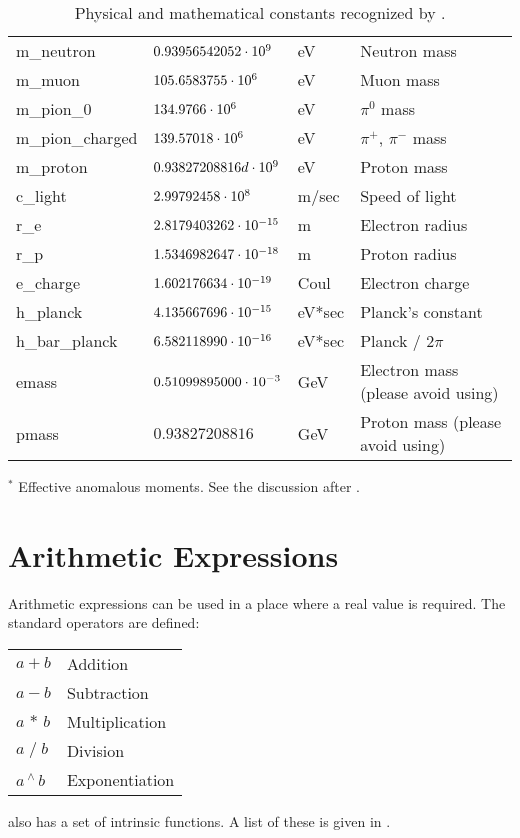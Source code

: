 {{{{{\begin{table}[h]
\begin{tabular}{llll}
  m_neutron             & $0.93956542052 \cdot 10^{9}$    & eV          & Neutron mass          \\
  m_muon                & $105.6583755 \cdot 10^{6}$      & eV          & Muon mass             \\
  m_pion_0              & $134.9766 \cdot 10^{6}$         & eV          & $\pi^0$ mass          \\
  m_pion_charged        & $139.57018 \cdot 10^{6}$        & eV          & $\pi^+$, $\pi^-$ mass \\
  m_proton              & $0.93827208816d \cdot 10^{9}$   & eV          & Proton mass           \\
  c_light               & $2.99792458 \cdot 10^{8}$       & m/sec       & Speed of light        \\
  r_e                   & $2.8179403262 \cdot 10^{-15}$   & m           & Electron radius       \\
  r_p                   & $1.5346982647 \cdot 10^{-18}$   & m           & Proton radius         \\
  e_charge              & $1.602176634 \cdot 10^{-19}$    & Coul        & Electron charge       \\
  h_planck              & $4.135667696 \cdot 10^{-15}$    & eV*sec      & Planck's constant     \\
  h_bar_planck          & $6.582118990 \cdot 10^{-16}$    & eV*sec      & Planck / $2\pi$       \\
  emass                 & $0.51099895000 \cdot 10^{-3}$   & GeV         & Electron mass (please avoid using)   \\
  pmass                 & $0.93827208816$            & GeV         & Proton mass (please avoid using)     \\ \bottomrule
\end{tabular}
$^*$ Effective anomalous moments. See the discussion after .
\caption{Physical and mathematical constants recognized by \bmad.}
\label{t:constants}
\end{table}

\section{Arithmetic Expressions}
\label{s:arith}

Arithmetic expressions can be used in a place where a real value is required.
The standard operators are defined: \hfil\break
\hspace*{0.15in}
\begin{tabular}{ll}
  $a + b$           & Addition        \\
  $a - b$           & Subtraction     \\
  $a \, \ast \, b$  & Multiplication  \\
  $a \; / \; b$     & Division        \\
  $a \, ^{\scriptstyle\wedge} \, b$ & Exponentiation  \\
\end{tabular}
\hfil\break
\bmad also has a set of intrinsic functions. A list of these is given
in .

}}}}}
